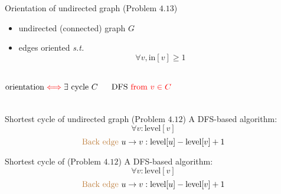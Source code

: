 \begin{frame}{}
  \begin{exampleblock}{Orientation of undirected graph (Problem $4.13$)}
    \begin{itemize}
      \item undirected (connected) graph $G$ 
      \item edges oriented \emph{s.t.} 
	\[
	  \forall v, \text{in}[v] \ge 1
	\]
    \end{itemize}
  \end{exampleblock}

  \pause
  \begin{columns}
      \[
	\text{orientation} \textcolor{red}{\iff} \exists \text{ cycle } C
      \]

      \pause
      \[
	\text{DFS \textcolor{red}{from} } \textcolor{red}{v \in C}
      \]
      \pause
  \end{columns}
\end{frame}

\begin{frame}{}
  \begin{exampleblock}{Shortest cycle of undirected graph (Problem $4.12$)}
    A  DFS-based algorithm:
    \[
      \forall v: \text{level}[v]
    \]
    \[
      \text{\textcolor{brown}{Back edge }} u \to v: \text{level}[u] - \text{level}[v] + 1
    \]
  \end{exampleblock}

  \pause
\end{frame}

\begin{frame}{}
  \begin{exampleblock}{Shortest cycle of  (Problem $4.12$)}
    A  DFS-based algorithm:
    \[
      \forall v: \text{level}[v]
    \]
    \[
      \text{\textcolor{brown}{Back edge }} u \to v: \text{level}[u] - \text{level}[v] + 1
    \]
  \end{exampleblock}

  \pause

\end{frame}
